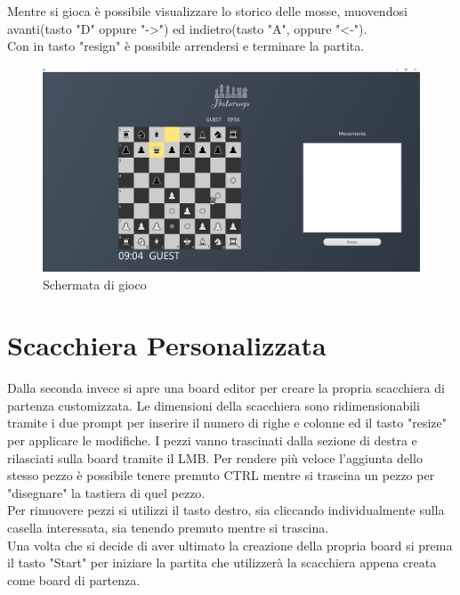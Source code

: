 \documentclass[a4paper,12pt]{report}
\begin{document}
\paragraph{}
\
\\
Mentre si gioca è possibile visualizzare lo storico delle mosse, muovendosi avanti(tasto "D" oppure "->") ed indietro(tasto "A", oppure "<-").
\\
Con in tasto "resign" è possibile arrendersi e terminare la partita.
\begin{figure}[H]
    \begin{center}
        \centering
        \includegraphics[scale=0.25]{img/guidaUtente/schermataDiGioco.png}
    \end{center}
    \caption{Schermata di gioco}
    \label{img:schermataDiGioco}
\end{figure}

\section{Scacchiera Personalizzata}
Dalla seconda invece si apre una board editor per creare la propria scacchiera di partenza customizzata. Le dimensioni della scacchiera sono ridimensionabili tramite i due prompt per inserire il numero di righe e colonne ed il tasto "resize" per applicare le modifiche.
I pezzi vanno trascinati dalla sezione di destra e rilasciati sulla board tramite il LMB. Per rendere più veloce l'aggiunta dello stesso pezzo è possibile tenere premuto CTRL mentre si trascina un pezzo per "disegnare" la tastiera di quel pezzo.\\
Per rimuovere pezzi si utilizzi il tasto destro, sia cliccando individualmente sulla casella interessata, sia tenendo premuto mentre si trascina.\\
Una volta che si decide di aver ultimato la creazione della propria board si prema il tasto "Start" per iniziare la partita che utilizzerà la scacchiera appena creata come board di partenza.
\end{document}
